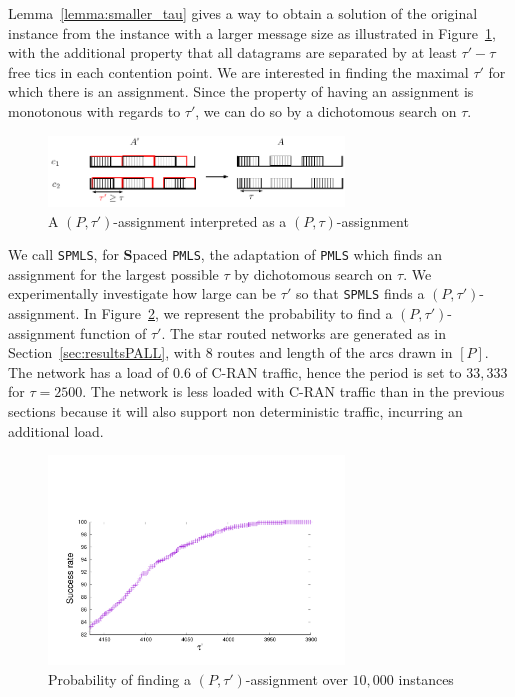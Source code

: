 \documentclass[a4paper,10pt]{journal}
\newcommand\PMLS{\texttt{PMLS}\xspace}
\newcommand\SPMLS{\texttt{SPMLS}\xspace}
\begin{document}
     Lemma~\ref{lemma:smaller_tau} gives a way to obtain a solution of the original instance from the instance with a larger message size as illustrated in Figure~\ref{fig:space}, with the additional property that all datagrams are separated
    by at least $\tau' - \tau$ free tics in each contention point. We are interested in finding the maximal $\tau'$
    for which there is an assignment. Since the property of having an assignment is monotonous with regards to $\tau'$,
    we can do so by a dichotomous search on $\tau$.

           \begin{figure}
       \begin{center}
      \includegraphics[width = 0.7\textwidth]{space.pdf}
      \end{center} 
      \caption{A $(P,\tau')$-assignment interpreted as a $(P,\tau)$-assignment}
      \label{fig:space}   
     \end{figure}   


    We call \SPMLS, for \textbf{S}paced \PMLS, the adaptation of \PMLS which finds an assignment for the largest possible $\tau$ by dichotomous search on $\tau$. We experimentally investigate how large can be $\tau'$ so that \SPMLS finds a $(P,\tau')$-assignment. In Figure~\ref{fig:spacetau}, we represent the probability to find a $(P,\tau')$-assignment function of $\tau'$. The star routed networks are generated as in Section~\ref{sec:resultsPALL}, with $8$ routes and length of the arcs drawn in $[P]$. The network has a load of $0.6$ of C-RAN traffic, hence the period is set to $33,333$ for $\tau = 2500$. The network is less loaded with C-RAN traffic than in the previous sections because it will also support non deterministic traffic, incurring an additional load.

    \begin{figure}
       \begin{center}
      \includegraphics[width = 0.7\textwidth]{distribtau.pdf}
      \end{center}
      \caption{Probability of finding a $(P,\tau')$-assignment over $10,000$ instances}
      \label{fig:spacetau}   
     \end{figure}   
\end{document}
